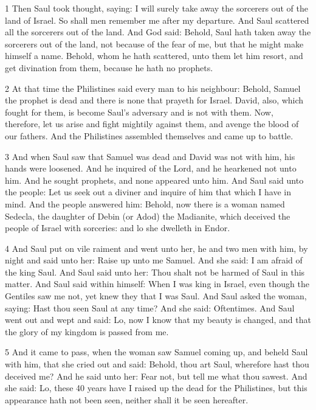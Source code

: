 \par 1 Then Saul took thought, saying: I will surely take away the sorcerers out of the land of Israel. So shall men remember me after my departure. And Saul scattered all the sorcerers out of the land. And God said: Behold, Saul hath taken away the sorcerers out of the land, not because of the fear of me, but that he might make himself a name. Behold, whom he hath scattered, unto them let him resort, and get divination from them, because he hath no prophets.

\par 2 At that time the Philistines said every man to his neighbour: Behold, Samuel the prophet is dead and there is none that prayeth for Israel. David, also, which fought for them, is become Saul's adversary and is not with them. Now, therefore, let us arise and fight mightily against them, and avenge the blood of our fathers. And the Philistines assembled themselves and came up to battle. 

\par 3 And when Saul saw that Samuel was dead and David was not with him, his hands were loosened. And he inquired of the Lord, and he hearkened not unto him. And he sought prophets, and none appeared unto him. And Saul said unto the people: Let us seek out a diviner and inquire of him that which I have in mind. And the people answered him: Behold, now there is a woman named Sedecla, the daughter of Debin (or Adod) the Madianite, which deceived the people of Israel with sorceries: and lo she dwelleth in Endor. 

\par 4 And Saul put on vile raiment and went unto her, he and two men with him, by night and said unto her: Raise up unto me Samuel. And she said: I am afraid of the king Saul. And Saul said unto her: Thou shalt not be harmed of Saul in this matter. And Saul said within himself: When I was king in Israel, even though the Gentiles saw me not, yet knew they that I was Saul. And Saul asked the woman, saying: Hast thou seen Saul at any time? And she said: Oftentimes. And Saul went out and wept and said: Lo, now I know that my beauty is changed, and that the glory of my kingdom is passed from me.

\par 5 And it came to pass, when the woman saw Samuel coming up, and beheld Saul with him, that she cried out and said: Behold, thou art Saul, wherefore hast thou deceived me? And he said unto her: Fear not, but tell me what thou sawest. And she said: Lo, these 40 years have I raised up the dead for the Philistines, but this appearance hath not been seen, neither shall it be seen hereafter. 

